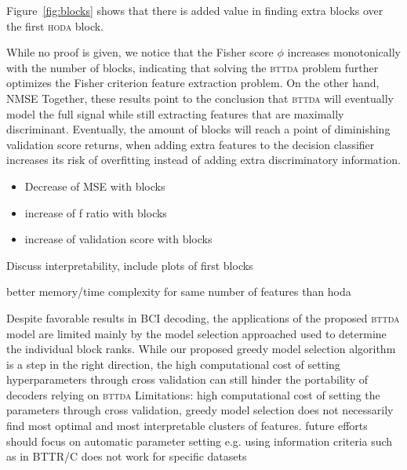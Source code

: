 \documentclass[twocolumn]{article}
\begin{document}
Figure~\ref{fig:blocks} shows that there is added value in finding extra blocks
over the first \textsc{hoda} block.
\begin{figure*}
  
  \caption{Normalized Mean Square Error (NMSE), (left), and difference in area
  under the receiver operating cure (ROC-AUC) for the training and validation
  folds in the model selection procedure (without feature selection) and test set obtained by a 20\% hold
  out (right), as a function of the number of BTTDA blocks $b$.
  While NMSE monotonically decreases for the evaluated datasets, better class
  separation will be achieved, but eventually overfitting occurs and validation
  and test scores will plateau or drop.
}
  \label{fig:blocks} \end{figure*}
While no proof is given, we notice that the Fisher score $\phi$ increases
monotonically with the number of blocks, indicating that solving the
\textsc{bttda} problem further optimizes the Fisher criterion feature
extraction problem.
On the other hand, NMSE 
Together, these results point to the conclusion that \textsc{bttda} will
eventually model the full signal while still extracting features that are
maximally discriminant.
Eventually, the amount of blocks will reach a point of diminishing validation
score returns, when adding extra features to the decision classifier increases
its risk of overfitting instead of adding extra discriminatory information.
\begin{itemize}
  \item Decrease of MSE with blocks
  \item increase of f ratio with blocks
  \item increase of validation score with blocks
\end{itemize}

Discuss interpretability, include plots of first blocks

better memory/time complexity for same number of features than hoda

Despite favorable results in BCI decoding, the applications of the proposed
\textsc{bttda} model are limited mainly by the model selection approached used
to determine the individual block ranks.
While our proposed greedy model selection algorithm is a step in the right
direction, the high computational cost of setting hyperparameters through cross
validation can still hinder the portability of decoders relying on
\textsc{bttda}
Limitations: high computational cost of setting the parameters through cross
validation, greedy model
selection does not necessarily find most optimal and most interpretable
clusters of features. future efforts
should focus on automatic parameter setting e.g. using information criteria
such as in BTTR/C
does not work for specific datasets
\end{document}
